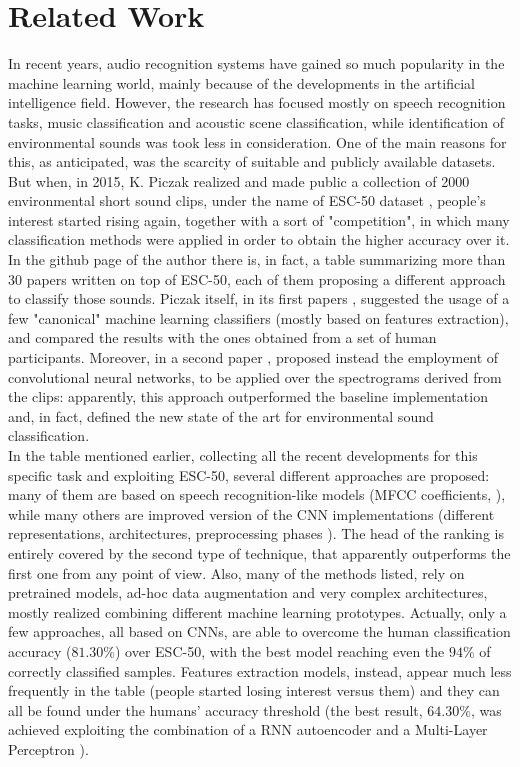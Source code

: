 
\section{Related Work}
\label{sec:related_work}

In recent years, audio recognition systems have gained so much popularity in the machine learning world, mainly because of the developments in the artificial intelligence field. However, the research has focused mostly on speech recognition tasks, music classification and acoustic scene classification, while identification of environmental sounds was took less in consideration. One of the main reasons for this, as anticipated, was the scarcity of suitable and publicly available datasets. But when, in 2015, K. Piczak realized and made public a collection of 2000 environmental short sound clips, under the name of ESC-50 dataset \cite{piczak2015dataset}, people's interest started rising again, together with a sort of "competition", in which many classification methods were applied in order to obtain the higher accuracy over it. In the github page of the author \cite{piczakgithub} there is, in fact, a table summarizing more than 30 papers written on top of ESC-50, each of them proposing a different approach to classify those sounds. Piczak itself, in its first papers \cite{piczak2015dataset}, suggested the usage of a few "canonical" machine learning classifiers (mostly based on features extraction), and compared the results with the ones obtained from a set of human participants. Moreover, in a second paper \cite{piczak_cnn}, proposed instead the employment of convolutional neural networks, to be applied over the spectrograms derived from the clips: apparently, this approach outperformed the baseline implementation and, in fact, defined the new state of the art for environmental sound classification.\\
In the table mentioned earlier, collecting all the recent developments for this specific task and exploiting ESC-50, several different approaches are proposed: many of them are based on speech recognition-like models (MFCC coefficients, \cite{piczak2015dataset, freitag2017}), while many others are improved version of the CNN implementations (different representations, architectures, preprocessing phases \cite{Huzaifah17, soundnet, boddapati2017, aclnet, ensemble_stacked_cnn}). The head of the ranking is entirely covered by the second type of technique, that apparently outperforms the first one from any point of view. Also, many of the methods listed, rely on pretrained models, ad-hoc data augmentation and very complex architectures, mostly realized combining different machine learning prototypes. Actually, only a few approaches, all based on CNNs, are able to overcome the human classification accuracy ($81.30\%$) over ESC-50, with the best model reaching even the $94\%$ of correctly classified samples. Features extraction models, instead, appear much less frequently in the table (people started losing interest versus them) and they can all be found under the humans' accuracy threshold (the best result, $64.30\%$, was achieved exploiting the combination of a RNN autoencoder and a Multi-Layer Perceptron \cite{freitag2017}).